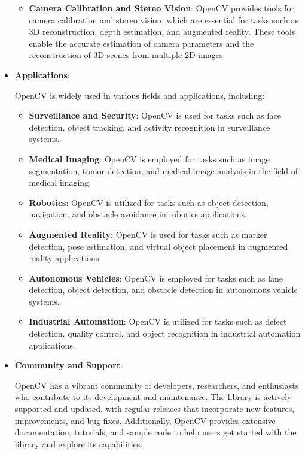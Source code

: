 \begin{itemize}
\begin{itemize}
        \item \textbf{Camera Calibration and Stereo Vision}: OpenCV provides tools for camera calibration and stereo vision, which are essential for tasks such as 3D reconstruction, depth estimation, and augmented reality. These tools enable the accurate estimation of camera parameters and the reconstruction of 3D scenes from multiple 2D images.
      \end{itemize}
      
    \item \textbf{Applications}:
    
      OpenCV is widely used in various fields and applications, including:
  
      \begin{itemize}
        \item \textbf{Surveillance and Security}: OpenCV is used for tasks such as face detection, object tracking, and activity recognition in surveillance systems.
        
        \item \textbf{Medical Imaging}: OpenCV is employed for tasks such as image segmentation, tumor detection, and medical image analysis in the field of medical imaging.
        
        \item \textbf{Robotics}: OpenCV is utilized for tasks such as object detection, navigation, and obstacle avoidance in robotics applications.
        
        \item \textbf{Augmented Reality}: OpenCV is used for tasks such as marker detection, pose estimation, and virtual object placement in augmented reality applications.
        
        \item \textbf{Autonomous Vehicles}: OpenCV is employed for tasks such as lane detection, object detection, and obstacle detection in autonomous vehicle systems.
        
        \item \textbf{Industrial Automation}: OpenCV is utilized for tasks such as defect detection, quality control, and object recognition in industrial automation applications.
      \end{itemize}
      
    \item \textbf{Community and Support}:
    
      OpenCV has a vibrant community of developers, researchers, and enthusiasts who contribute to its development and maintenance. The library is actively supported and updated, with regular releases that incorporate new features, improvements, and bug fixes. Additionally, OpenCV provides extensive documentation, tutorials, and sample code to help users get started with the library and explore its capabilities.
  \end{itemize}
  
